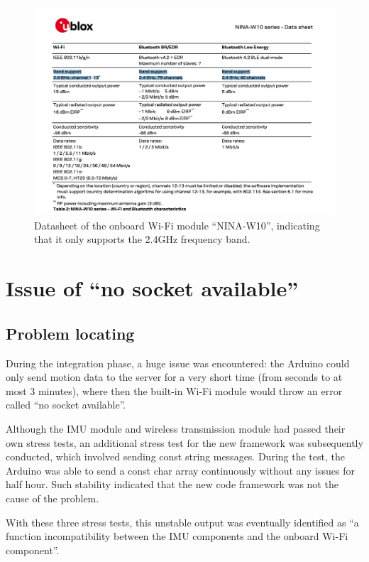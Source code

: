 \begin{figure}[htbp]
	\centering
	\includegraphics[width=\textwidth]{
		fileForWriting/wifinina}
	\caption[Datasheet of the onboard Wi-Fi module ``NINA-W10'']{Datasheet of the onboard Wi-Fi module ``NINA-W10'', indicating that it only supports the 2.4GHz frequency band.}
	\label{fig:2.4Gonly}
\end{figure}


\section{Issue of ``no socket available''}
\subsection{Problem locating}
During the integration phase, a huge issue was encountered: the Arduino could only send motion data to the server for a very short time (from seconds to at most 3 minutes), where then the built-in Wi-Fi module would throw an error called ``no socket available''.

Although the IMU module and wireless transmission module had passed their own stress tests, an additional stress test for the new framework was subsequently conducted, which involved sending const string messages.
During the test, the Arduino was able to send a const char array continuously without any issues for half hour.
Such stability indicated that the new code framework was not the cause of the problem.

With these three stress tests, this unstable output was eventually identified as ``a function incompatibility between the IMU components and the onboard Wi-Fi component''.


